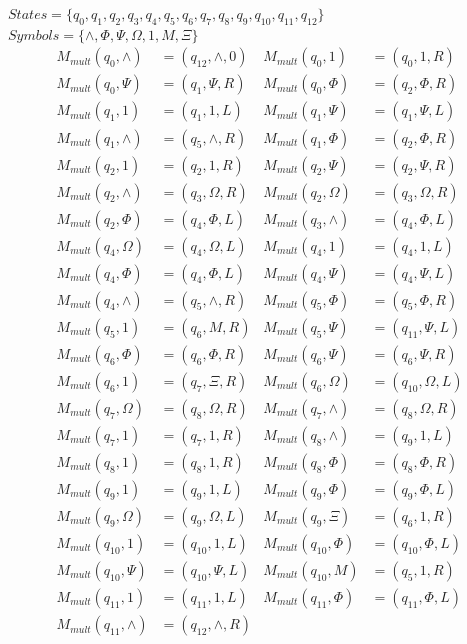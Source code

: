 \documentclass[11pt]{article}
\begin{document}
$States = \{q_0, q_1, q_2, q_3, q_4, q_5, q_6, q_7, q_8, q_9, q_{10}, q_{11}, q_{12}\}$\\
$Symbols = \{\wedge, \Phi, \Psi, \Omega, 1, M, \Xi \}$
\begin{align*}
M_{mult}(q_0, \wedge) &= (q_{12}, \wedge, 0)    &     M_{mult}(q_0, 1) &= (q_{0}, 1, R) \\
M_{mult}(q_{0}, \Psi) &= (q_{1}, \Psi, R)    &     M_{mult}(q_{0}, \Phi) &= (q_{2}, \Phi, R) \\
M_{mult}(q_{1}, 1) &= (q_{1}, 1, L)    &     M_{mult}(q_{1}, \Psi) &= (q_{1}, \Psi, L) \\
M_{mult}(q_{1}, \wedge) &= (q_{5}, \wedge, R)    &     M_{mult}(q_{1}, \Phi) &= (q_{2}, \Phi, R) \\
M_{mult}(q_{2}, 1) &= (q_{2}, 1, R)    &     M_{mult}(q_{2}, \Psi) &= (q_{2}, \Psi, R) \\
M_{mult}(q_{2}, \wedge) &= (q_{3}, \Omega, R)    &     M_{mult}(q_{2}, \Omega) &= (q_{3}, \Omega, R) \\
M_{mult}(q_{2}, \Phi) &= (q_{4}, \Phi, L)    &     M_{mult}(q_{3}, \wedge) &= (q_{4}, \Phi, L) \\
M_{mult}(q_{4}, \Omega) &= (q_{4}, \Omega, L)    &     M_{mult}(q_{4}, 1) &= (q_{4}, 1, L) \\
M_{mult}(q_{4}, \Phi) &= (q_{4}, \Phi, L)    &     M_{mult}(q_{4}, \Psi) &= (q_{4}, \Psi, L) \\
M_{mult}(q_{4}, \wedge) &= (q_{5}, \wedge, R)    &     M_{mult}(q_{5}, \Phi) &= (q_{5}, \Phi, R) \\
M_{mult}(q_{5}, 1) &= (q_{6}, M, R)    &     M_{mult}(q_{5}, \Psi) &= (q_{11}, \Psi, L) \\
M_{mult}(q_{6}, \Phi) &= (q_{6}, \Phi, R)    &     M_{mult}(q_{6}, \Psi) &= (q_{6}, \Psi, R) \\
M_{mult}(q_{6}, 1) &= (q_{7}, \Xi, R)    &     M_{mult}(q_{6}, \Omega) &= (q_{10}, \Omega, L) \\
M_{mult}(q_{7}, \Omega) &= (q_{8}, \Omega, R)    &     M_{mult}(q_{7}, \wedge) &= (q_{8}, \Omega, R) \\
M_{mult}(q_{7}, 1) &= (q_{7}, 1, R)	&	M_{mult}(q_{8}, \wedge) &= (q_{9}, 1, L) \\
M_{mult}(q_{8}, 1) &= (q_{8}, 1, R)	&	M_{mult}(q_{8}, \Phi) &= (q_{8}, \Phi, R) \\
M_{mult}(q_{9}, 1) &= (q_{9}, 1, L)	&	M_{mult}(q_{9}, \Phi) &= (q_{9}, \Phi, L) \\
M_{mult}(q_{9}, \Omega) &= (q_{9}, \Omega, L)	&	M_{mult}(q_{9}, \Xi) &= (q_{6}, 1, R) \\
M_{mult}(q_{10}, 1) &= (q_{10}, 1, L)	&	M_{mult}(q_{10}, \Phi) &= (q_{10}, \Phi, L) \\
M_{mult}(q_{10}, \Psi) &= (q_{10}, \Psi, L)	&	M_{mult}(q_{10}, M) &= (q_{5}, 1, R) \\
M_{mult}(q_{11}, 1) &= (q_{11}, 1, L)	&	M_{mult}(q_{11}, \Phi) &= (q_{11}, \Phi, L) \\
M_{mult}(q_{11}, \wedge) &= (q_{12}, \wedge, R)	 \\
\end{align*}
\end{document}
